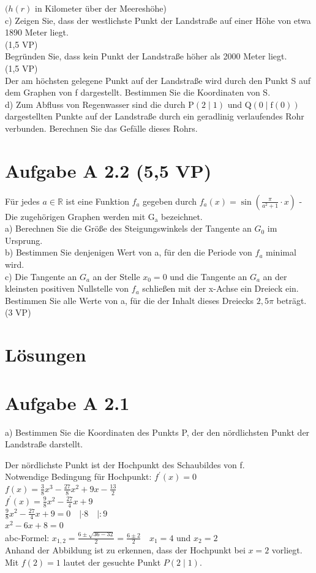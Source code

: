 \documentclass[10pt]{article}
\begin{document}
$(h(r)$ in Kilometer über der Meereshöhe)\\
c) Zeigen Sie, dass der westlichste Punkt der Landstraße auf einer Höhe von etwa 1890 Meter liegt.\\
(1,5 VP)\\
Begründen Sie, dass kein Punkt der Landstraße höher als 2000 Meter liegt.\\
(1,5 VP)\\
Der am höchsten gelegene Punkt auf der Landstraße wird durch den Punkt S auf dem Graphen von f dargestellt. Bestimmen Sie die Koordinaten von S.\\
d) Zum Abfluss von Regenwasser sind die durch $\mathrm{P}(2 \mid 1)$ und $\mathrm{Q}(0 \mid \mathrm{f}(0))$ dargestellten Punkte auf der Landstraße durch ein geradlinig verlaufendes Rohr verbunden. Berechnen Sie das Gefälle dieses Rohrs.

\section*{Aufgabe A 2.2 (5,5 VP)}
Für jedes $a \in \mathbb{R}$ ist eine Funktion $f_{a}$ gegeben durch $f_{a}(x)=\sin \left(\frac{\pi}{a^{2}+1} \cdot x\right)$ -\\
Die zugehörigen Graphen werden mit $\mathrm{G}_{\mathrm{a}}$ bezeichnet.\\
a) Berechnen Sie die Größe des Steigungswinkels der Tangente an $G_{0}$ im Ursprung.\\
b) Bestimmen Sie denjenigen Wert von a, für den die Periode von $f_{a}$ minimal wird.\\
c) Die Tangente an $G_{a}$ an der Stelle $x_{0}=0$ und die Tangente an $G_{a}$ an der kleinsten positiven Nullstelle von $f_{a}$ schließen mit der x-Achse ein Dreieck ein. Bestimmen Sie alle Werte von a, für die der Inhalt dieses Dreiecks $2,5 \pi$ beträgt. (3 VP)

\section*{Lösungen}
\section*{Aufgabe A 2.1}
a) Bestimmen Sie die Koordinaten des Punkts P, der den nördlichsten Punkt der Landstraße darstellt.

Der nördlichste Punkt ist der Hochpunkt des Schaubildes von f.\\
Notwendige Bedingung für Hochpunkt: $f^{\prime}(x)=0$\\
$f(x)=\frac{3}{8} x^{3}-\frac{27}{8} x^{2}+9 x-\frac{13}{2}$\\
$f^{\prime}(x)=\frac{9}{8} x^{2}-\frac{27}{4} x+9$\\
$\frac{9}{8} x^{2}-\frac{27}{4} x+9=0 \quad|\cdot 8 \quad|: 9$\\
$x^{2}-6 x+8=0$\\
abc-Formel: $x_{1,2}=\frac{6 \pm \sqrt{36-32}}{2}=\frac{6 \pm 2}{2} \quad x_{1}=4$ und $x_{2}=2$\\
Anhand der Abbildung ist zu erkennen, dass der Hochpunkt bei $x=2$ vorliegt. Mit $f(2)=1$ lautet der gesuchte Punkt $P(2 \mid 1)$.
\end{document}
